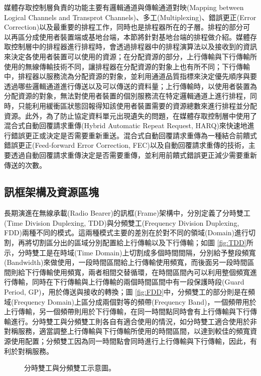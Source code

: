 媒體存取控制\cite{MAC_spec}層負責的功能主要有邏輯通道與傳輸通道對映(Mapping between Logical Channels and Transprot Channels)、多工(Multiplexing)、錯誤更正(Error Correction)以及最重要的排程工作，同時也是排程器所在的子層。排程的部分可以再區分成使用者裝置端或基地台端，本節將針對基地台端的排程做介紹。媒體存取控制層中的排程器進行排程時，會透過排程器中的排程演算法以及接收到的資訊來決定各使用者裝置可以使用的資源；在分配資源的部分，上行傳輸與下行傳輸所使用的無線傳輸技術不同，讓排程器在分配資源的對象上也有所不同；下行傳輸中，排程器以服務流為分配資源的對象，並利用通道品質指標來決定優先順序與要透過哪些邏輯通道進行傳送以及可以傳送的資料量；上行傳輸時，以使用者裝置為分配資源的對象，無法對使用者裝置的個別服務流在特定邏輯通道上進行排程，同時，只能利用緩衝區狀態回報得知該使用者裝置需要的資源總數來進行排程並分配資源。此外，為了防止協定資料單元出現遺失的問題，在媒體存取控制層中使用了混合式自動回覆請求重傳(Hybrid Automatic Repeat Request, HARQ)來快速地進行錯誤更正或決定是否需要重新重送。混合式自動回覆請求重傳為一種結合前饋式錯誤更正(Feed-forward Error Correction, FEC)以及自動回覆請求重傳的技術，主要透過自動回覆請求重傳決定是否需要重傳，並利用前饋式錯誤更正減少需要重新傳送的次數。

\subsection{訊框架構及資源區塊\label{frame_RB}}
長期演進在無線承載(Radio Bearer)的訊框(Frame)架構中，分別定義了分時雙工(Time Division Duplexing, TDD)與分頻雙工(Frequency Division Duplexing, FDD)兩種不同的模式\cite{FDD_TDD_spec}。這兩種模式主要的差別在於對不同的領域(Domain)進行切割，再將切割區分出的區域分別配置給上行傳輸以及下行傳輸；如圖 \ref{fig:TDD}所示，分時雙工是在時域(Time Domain)上切割成多個時間間隔，分別給予整段頻寬(Bandwidth)來做使用，一段時間區間給上行傳輸使用頻寬，而後面另一段時間區間則給下行傳輸使用頻寬，兩者相間交替循環，在時間區間內可以利用整個頻寬進行傳輸，同時在下行傳輸與上行傳輸的兩個時間區間中有一段保護時段(Guard Period, GP)，用於傳送與接收的轉換；圖 \ref{fig:FDD}中，分頻雙工的部分則是在頻域(Frequency Domain)上區分成兩個對等的頻帶(Frequency Band)，一個頻帶用於上行傳輸，另一個頻帶則用於下行傳輸，在同一時間點同時會有上行傳輸與下行傳輸進行。分時雙工與分頻雙工則各自有適合使用的情況，如分時雙工適合使用於非對稱服務，適當調整上行傳輸與下行傳輸所使用的時間區間，以達到較佳的頻寬資源使用配置；分頻雙工因為同一時間點會同時進行上行傳輸與下行傳輸，因此，有利於對稱服務。

\vskip 20pt
\begin{figure}[H]
\centering
{}
\caption{\label{fig:TDD_FDD}分時雙工與分頻雙工示意圖。}
\end{figure}

